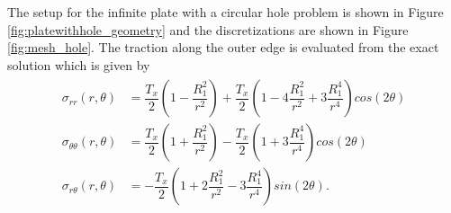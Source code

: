 \documentclass{article}
\begin{document}
The setup for the infinite plate with a circular hole problem is shown in Figure \ref{fig:platewithhole_geometry} and the discretizations are shown in Figure \ref{fig:mesh_hole}. The traction along the outer edge is evaluated from the exact solution which is given by
\begin{align}
\begin{split}
\sigma_{rr}(r,\theta)&=\dfrac{T_x}{2}(1-\dfrac{R_1^2}{r^2})+\dfrac{T_x}{2}(1-4\dfrac{R_1^2}{r^2}+3\dfrac{R_1^4}{r^4})cos(2\theta)\\
\sigma_{\theta\theta}(r,\theta)&=\dfrac{T_x}{2}(1+\dfrac{R_1^2}{r^2})-\dfrac{T_x}{2}(1+3\dfrac{R_1^4}{r^4})cos(2\theta)\\
\sigma_{r\theta}(r,\theta)&=-\dfrac{T_x}{2}(1+2\dfrac{R_1^2}{r^2}-3\dfrac{R_1^4}{r^4})sin(2\theta).
\end{split}
\end{align}
\end{document}
